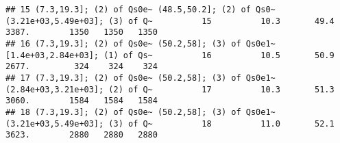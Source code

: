 \documentclass[
]{book}
\newenvironment{Shaded}{\begin{snugshade}}{\end{snugshade}}
\newcommand{\KeywordTok}[1]{\textcolor[rgb]{0.13,0.29,0.53}{\textbf{#1}}}
\newcommand{\NormalTok}[1]{#1}
\newcommand{\OperatorTok}[1]{\textcolor[rgb]{0.81,0.36,0.00}{\textbf{#1}}}
\newcommand{\StringTok}[1]{\textcolor[rgb]{0.31,0.60,0.02}{#1}}
\begin{document}
\begin{verbatim}
## 15 (7.3,19.3]; (2) of Qs0e~ (48.5,50.2]; (2) of Qs0~ (3.21e+03,5.49e+03]; (3) of Q~          15          10.3       49.4     3387.        1350   1350   1350
## 16 (7.3,19.3]; (2) of Qs0e~ (50.2,58]; (3) of Qs0e1~ [1.4e+03,2.84e+03]; (1) of Qs~          16          10.5       50.9     2677.         324    324    324
## 17 (7.3,19.3]; (2) of Qs0e~ (50.2,58]; (3) of Qs0e1~ (2.84e+03,3.21e+03]; (2) of Q~          17          10.3       51.3     3060.        1584   1584   1584
## 18 (7.3,19.3]; (2) of Qs0e~ (50.2,58]; (3) of Qs0e1~ (3.21e+03,5.49e+03]; (3) of Q~          18          11.0       52.1     3623.        2880   2880   2880
\end{verbatim}

\begin{Shaded}
\end{Shaded}
\end{document}
